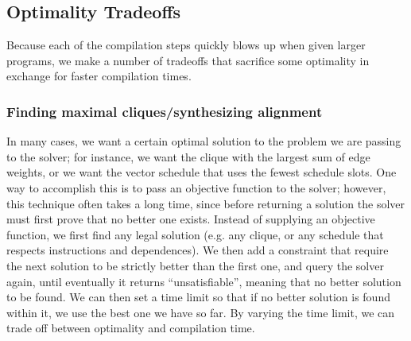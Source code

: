 \subsection{Optimality Tradeoffs}\label{sec:optimality-tradeoffs}
Because each of the compilation steps quickly blows up when given larger programs, we make a number of tradeoffs that sacrifice some optimality in exchange for faster compilation times.
\subsubsection*{Finding maximal cliques/synthesizing alignment}\label{sec:iterative-synthesis}
In many cases, we want a certain optimal solution to the problem we are passing to the solver; for instance, we want the clique with the largest sum of edge weights, or we want the vector schedule that uses the fewest schedule slots.
One way to accomplish this is to pass an objective function to the solver; however, this technique often takes a long time, since before returning a solution the solver must first prove that no better one exists.
Instead of supplying an objective function, we first find any legal solution (e.g. any clique, or any schedule that respects instructions and dependences).
We then add a constraint that require the next solution to be strictly better than the first one, and query the solver again, until eventually it returns ``unsatisfiable'', meaning that no better solution to be found.
We can then set a time limit so that if no better solution is found within it, we use the best one we have so far.
By varying the time limit, we can trade off between optimality and compilation time.

